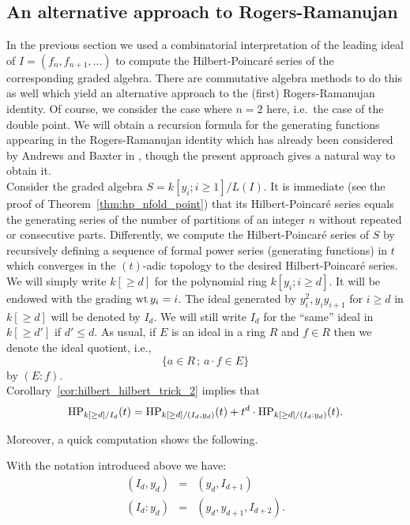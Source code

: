 \subsection{An alternative approach to Rogers-Ramanujan}
In the previous section we used a combinatorial interpretation of the
leading ideal of $I=(f_n,f_{n+1},\ldots)$ to compute the Hilbert-Poincar\'e series of the
corresponding graded algebra. There are commutative algebra methods to
do this as well which yield an alternative approach to the (first) Rogers-Ramanujan
identity. Of course, we consider the case where $n=2$ here, i.e.\ the case of the double point. We will obtain a recursion formula for the
generating functions appearing in the Rogers-Ramanujan identity which has already been considered
by Andrews and Baxter in \cite{andrews_baxter}, though the present
approach gives a natural way to obtain it.\\

Consider the graded algebra $S=k[y_i;i\geq 1]/L(I)$. It is immediate
(see the proof of Theorem~\ref{thm:hp_nfold_point}) that its
Hilbert-Poincar\'e series equals the generating series of the number of partitions of
an integer $n$ without repeated or consecutive parts. Differently, we
compute the Hilbert-Poincar\'e series of $S$ by recursively defining a sequence of
formal power series (generating functions) in $t$ which converges in
the $(t)$-adic topology to the desired Hilbert-Poincar\'e series. We will simply write $k[\geq d]$ for the polynomial ring $k[y_i; i \geq d]$. It will be endowed with the grading $\textnormal{wt}\, y_i = i$. The ideal generated by $y^2_i, y_iy_{i+1}$ for $i\geq d$ in $k[\geq  d]$ will be denoted by $I_d$. We will still write $I_d$ for the ``same'' ideal in $k[\geq d']$ if $d'\leq d$. As usual, if $E$ is an ideal in a ring
$R$ and $f\in R$ then we denote the ideal quotient, i.e., 
\[ \{a\in R\, ;\,  a\cdot f\in E \} \]
by $(E:f)$. \\

Corollary~\ref{cor:hilbert_hilbert_trick_2} implies that $$\operatorname{HP}_{k[\geq
  d]/I_d}(t) = \operatorname{HP}_{k[\geq d]/(I_d,y_d)}(t) + t^d\cdot \operatorname{HP}_{k[\geq
  d]/(I_d:y_d)}(t).$$

Moreover, a quick computation shows the following.

\begin{Prop}
With the notation introduced above we have:
\begin{eqnarray*}
(I_d,y_d)  & = & (y_d,I_{d+1})\\
(I_d:y_d) & = & (y_d,y_{d+1},I_{d+2}).
\end{eqnarray*}
\end{Prop}

